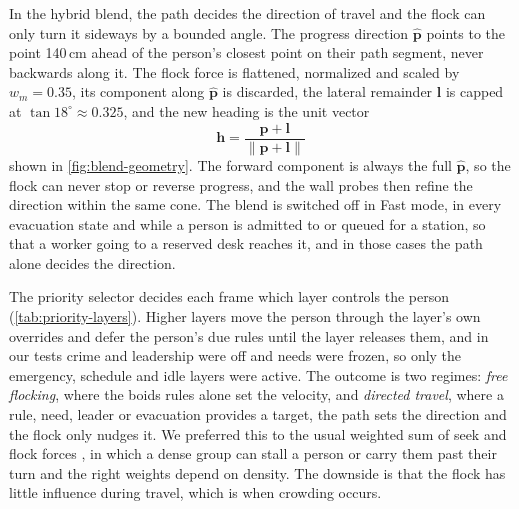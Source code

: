 In the hybrid blend, the path decides the direction of travel and the flock can only turn it sideways by a bounded angle. The progress direction $\hat{\mathbf{p}}$ points to the point 140\,cm ahead of the person's closest point on their path segment, never backwards along it. The flock force is flattened, normalized and scaled by $w_m=0.35$, its component along $\hat{\mathbf{p}}$ is discarded, the lateral remainder $\mathbf{l}$ is capped at $\tan 18^\circ\approx0.325$, and the new heading is the unit vector
\begin{equation}
\mathbf{h}=\frac{\hat{\mathbf{p}}+\mathbf{l}}{\lVert\hat{\mathbf{p}}+\mathbf{l}\rVert}
\label{eq:blend-heading}
\end{equation}
shown in \cref{fig:blend-geometry}. The forward component is always the full $\hat{\mathbf{p}}$, so the flock can never stop or reverse progress, and the wall probes then refine the direction within the same cone. The blend is switched off in Fast mode, in every evacuation state and while a person is admitted to or queued for a station, so that a worker going to a reserved desk reaches it, and in those cases the path alone decides the direction.

The priority selector decides each frame which layer controls the person (\cref{tab:priority-layers}). Higher layers move the person through the layer's own overrides and defer the person's due rules until the layer releases them, and in our tests crime and leadership were off and needs were frozen, so only the emergency, schedule and idle layers were active. The outcome is two regimes: \emph{free flocking}, where the boids rules alone set the velocity, and \emph{directed travel}, where a rule, need, leader or evacuation provides a target, the path sets the direction and the flock only nudges it. We preferred this to the usual weighted sum of seek and flock forces \citep{reynolds1999steering}, in which a dense group can stall a person or carry them past their turn and the right weights depend on density. The downside is that the flock has little influence during travel, which is when crowding occurs.

